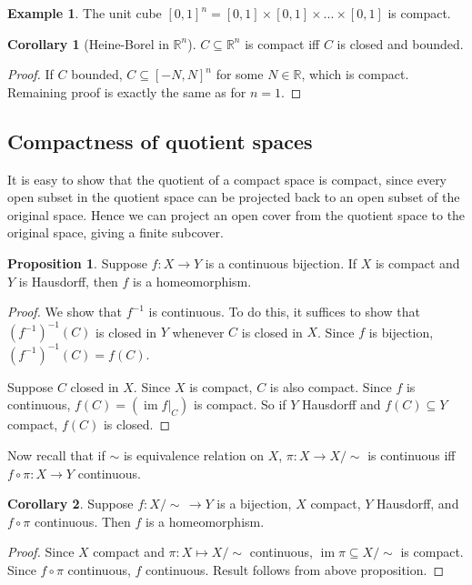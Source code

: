 \documentclass[a4paper,11pt]{article}
\theoremstyle{definition}
\newtheorem*{prop}{Proposition}
\newtheorem*{ex}{Example}
\newtheorem*{cor}{Corollary}
\DeclareMathOperator{\im}{im}
\numberwithin{equation}{section}
\begin{document}
\begin{ex}
The unit cube $[0,1]^n=[0,1]\times[0,1]\times...\times[0,1]$ is compact.
\end{ex}

\begin{cor}[Heine-Borel in $\mathbb{R}^n$]
$C\subseteq\mathbb{R}^n$ is compact iff $C$ is closed and bounded.
\end{cor}

\begin{proof}
    If $C$ bounded, $C\subseteq[-N,N]^n$ for some $N\in\mathbb{R}$, which is compact. Remaining proof is exactly the same as for $n=1$. 
\end{proof}

\subsection{Compactness of quotient spaces}
It is easy to show that the quotient of a compact space is compact, since every open subset in the quotient space can be projected back to an open subset of the original space. Hence we can project an open cover from the quotient space to the original space, giving a finite subcover.

\begin{prop}
    Suppose $f:X\rightarrow Y$ is a continuous bijection. If $X$ is compact and $Y$ is Hausdorff, then $f$ is a homeomorphism.
\end{prop}

\begin{proof}
    We show that $f^{-1}$ is continuous. To do this, it suffices to show that $(f^{-1})^{-1}(C)$ is closed in $Y$ whenever $C$ is closed in $X$. Since $f$ is bijection, $(f^{-1})^{-1}(C)=f(C)$.
    
    Suppose $C$ closed in $X$. Since $X$ is compact, $C$ is also compact. Since $f$ is continuous, $f(C)=(\im f|_C)$ is compact. So if $Y$ Hausdorff and $f(C)\subseteq Y$ compact, $f(C)$ is closed.
\end{proof}

Now recall that if $\sim$ is equivalence relation on $X$, $\pi:X\rightarrow X/\sim$ is continuous iff $f\circ\pi:X\rightarrow Y$ continuous.

\begin{cor}
Suppose $f:X/\sim\,\rightarrow Y$ is a bijection, $X$ compact, $Y$ Hausdorff, and $f\circ\pi$ continuous. Then $f$ is a homeomorphism.
\end{cor}

\begin{proof}
    Since $X$ compact and $\pi:X\mapsto X/\sim$ continuous, $\im\pi\subseteq X/\sim$ is compact. Since $f\circ\pi$ continuous, $f$ continuous. Result follows from above proposition.
\end{proof}
\end{document}
